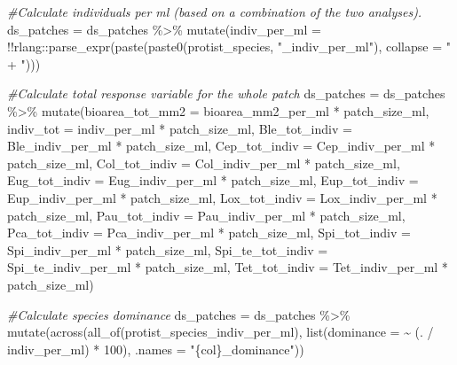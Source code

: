 \documentclass[
]{article}
\newenvironment{Shaded}{\begin{snugshade}}{\end{snugshade}}
\newcommand{\AttributeTok}[1]{\textcolor[rgb]{0.77,0.63,0.00}{#1}}
\newcommand{\CommentTok}[1]{\textcolor[rgb]{0.56,0.35,0.01}{\textit{#1}}}
\newcommand{\DecValTok}[1]{\textcolor[rgb]{0.00,0.00,0.81}{#1}}
\newcommand{\FunctionTok}[1]{\textcolor[rgb]{0.00,0.00,0.00}{#1}}
\newcommand{\NormalTok}[1]{#1}
\newcommand{\OtherTok}[1]{\textcolor[rgb]{0.56,0.35,0.01}{#1}}
\newcommand{\SpecialCharTok}[1]{\textcolor[rgb]{0.00,0.00,0.00}{#1}}
\newcommand{\StringTok}[1]{\textcolor[rgb]{0.31,0.60,0.02}{#1}}
\begin{document}
\begin{Shaded}
\begin{Highlighting}[]
\CommentTok{\#Calculate individuals per ml (based on a combination of the two analyses). }
\NormalTok{ds\_patches }\OtherTok{=}\NormalTok{ ds\_patches }\SpecialCharTok{\%\textgreater{}\%}
  \FunctionTok{mutate}\NormalTok{(}\AttributeTok{indiv\_per\_ml =} \SpecialCharTok{!!}\NormalTok{rlang}\SpecialCharTok{::}\FunctionTok{parse\_expr}\NormalTok{(}\FunctionTok{paste}\NormalTok{(}\FunctionTok{paste0}\NormalTok{(protist\_species, }\StringTok{"\_indiv\_per\_ml"}\NormalTok{), }\AttributeTok{collapse =} \StringTok{" + "}\NormalTok{)))}

\CommentTok{\#Calculate total response variable for the whole patch}
\NormalTok{ds\_patches }\OtherTok{=}\NormalTok{ ds\_patches }\SpecialCharTok{\%\textgreater{}\%}
  \FunctionTok{mutate}\NormalTok{(}\AttributeTok{bioarea\_tot\_mm2 =}\NormalTok{ bioarea\_mm2\_per\_ml }\SpecialCharTok{*}\NormalTok{ patch\_size\_ml,}
         \AttributeTok{indiv\_tot =}\NormalTok{ indiv\_per\_ml }\SpecialCharTok{*}\NormalTok{ patch\_size\_ml,}
         \AttributeTok{Ble\_tot\_indiv =}\NormalTok{ Ble\_indiv\_per\_ml }\SpecialCharTok{*}\NormalTok{ patch\_size\_ml,}
         \AttributeTok{Cep\_tot\_indiv =}\NormalTok{ Cep\_indiv\_per\_ml }\SpecialCharTok{*}\NormalTok{ patch\_size\_ml,}
         \AttributeTok{Col\_tot\_indiv =}\NormalTok{ Col\_indiv\_per\_ml }\SpecialCharTok{*}\NormalTok{ patch\_size\_ml,}
         \AttributeTok{Eug\_tot\_indiv =}\NormalTok{ Eug\_indiv\_per\_ml }\SpecialCharTok{*}\NormalTok{ patch\_size\_ml,}
         \AttributeTok{Eup\_tot\_indiv =}\NormalTok{ Eup\_indiv\_per\_ml }\SpecialCharTok{*}\NormalTok{ patch\_size\_ml,}
         \AttributeTok{Lox\_tot\_indiv =}\NormalTok{ Lox\_indiv\_per\_ml }\SpecialCharTok{*}\NormalTok{ patch\_size\_ml,}
         \AttributeTok{Pau\_tot\_indiv =}\NormalTok{ Pau\_indiv\_per\_ml }\SpecialCharTok{*}\NormalTok{ patch\_size\_ml,}
         \AttributeTok{Pca\_tot\_indiv =}\NormalTok{ Pca\_indiv\_per\_ml }\SpecialCharTok{*}\NormalTok{ patch\_size\_ml,}
         \AttributeTok{Spi\_tot\_indiv =}\NormalTok{ Spi\_indiv\_per\_ml }\SpecialCharTok{*}\NormalTok{ patch\_size\_ml,}
         \AttributeTok{Spi\_te\_tot\_indiv =}\NormalTok{ Spi\_te\_indiv\_per\_ml }\SpecialCharTok{*}\NormalTok{ patch\_size\_ml,}
         \AttributeTok{Tet\_tot\_indiv =}\NormalTok{ Tet\_indiv\_per\_ml }\SpecialCharTok{*}\NormalTok{ patch\_size\_ml)}


\CommentTok{\#Calculate species dominance}
\NormalTok{ds\_patches }\OtherTok{=}\NormalTok{ ds\_patches }\SpecialCharTok{\%\textgreater{}\%}
  \FunctionTok{mutate}\NormalTok{(}\FunctionTok{across}\NormalTok{(}\FunctionTok{all\_of}\NormalTok{(protist\_species\_indiv\_per\_ml), }
                \FunctionTok{list}\NormalTok{(}\AttributeTok{dominance =} \SpecialCharTok{\textasciitilde{}}\NormalTok{ (. }\SpecialCharTok{/}\NormalTok{ indiv\_per\_ml) }\SpecialCharTok{*} \DecValTok{100}\NormalTok{), }
                \AttributeTok{.names =} \StringTok{"\{col\}\_dominance"}\NormalTok{))}


\end{Highlighting}
\end{Shaded}
\end{document}
